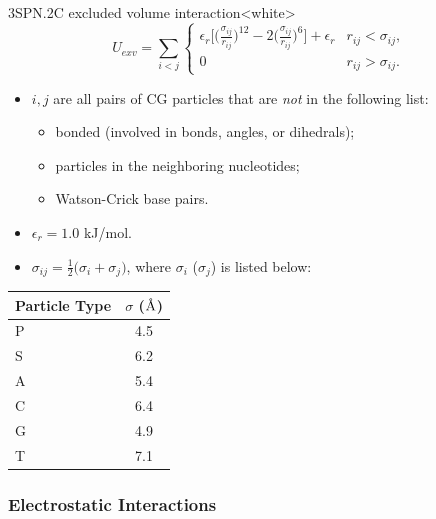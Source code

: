 \begin{smallpage}{3SPN.2C excluded volume interaction}<white>
  \begin{equation}
    \label{eq:dna_3spn2c_nonlocal_exv}
    U_{exv} = \sum_{i<j}
    \begin{cases}\displaystyle
      \epsilon_r\bigg[ \Big(\frac{\sigma_{ij}}{r_{ij}} \Big)^{12} - 2 \Big(\frac{\sigma_{ij}}{r_{ij}} \Big)^6 \bigg]+ \epsilon_r & r_{ij} < \sigma_{ij},  \\
      0 & r_{ij} > \sigma_{ij}.
    \end{cases}
  \end{equation}
  \tcblower
  \begin{itemize}
  \item $i, j$ are all pairs of CG particles that are \emph{not} in the
    following list:
    \begin{itemize}
    \item bonded (involved in bonds, angles, or dihedrals);
    \item particles in the neighboring nucleotides;
    \item Watson-Crick base pairs.
    \end{itemize}
  \item $\epsilon_{r} = 1.0$ kJ/mol.
  \item $\displaystyle \sigma_{ij} = \frac{1}{2}\big( \sigma_i + \sigma_j
    \big)$, where $\sigma_i$ ($\sigma_j$) is listed below:
  \end{itemize}
  \begin{center}
    \begin{tabular}{lc}
      \toprule
      Particle Type    & $\sigma$ ($\textup{\AA}$) \\
      \midrule
      P  &  4.5 \\
      S  &  6.2 \\
      A  &  5.4 \\
      C  &  6.4 \\
      G  &  4.9 \\
      T  &  7.1 \\
      \bottomrule
    \end{tabular}
  \end{center}
\end{smallpage}



\subsubsection{Electrostatic Interactions}
\label{sec:dna_3spn2c_potential_ele}


